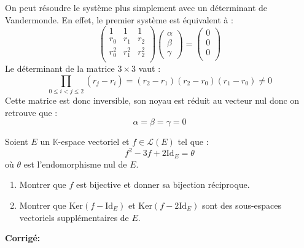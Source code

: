 \documentclass[a4paper,twoside,french,11pt]{VcCours}
\newcommand{\corr}{\textbf{Corrigé:}}
\begin{document}
\begin{enumerate}
\noindent On peut résoudre le système plus simplement avec un déterminant de Vandermonde. En effet, le premier système est équivalent à :
$$ \begin{pmatrix}
1 & 1 & 1 \\
r_0 & r_1 & r_2 \\
r_0^2 & r_1^2 & r_2^2 \\
\end{pmatrix} \begin{pmatrix}
\alpha \\
\beta \\
\gamma
\end{pmatrix} = \begin{pmatrix}
0 \\
0 \\
0 \\
\end{pmatrix}$$ 
Le déterminant de la matrice $3 \times 3$ vaut :
$$ \prod_{0 \leq i <j \leq 2} (r_j-r_i) = (r_2-r_1)(r_2-r_0)(r_1-r_0) \neq 0$$
Cette matrice est donc inversible, son noyau est réduit au vecteur nul donc on retrouve que :
$$ \alpha = \beta = \gamma = 0$$
\end{enumerate}





\begin{Exercice}{} Soient $E$ un $\mathbb{K}$-espace vectoriel et $f \in \mathcal{L}(E)$ tel que :
    \[
    f^2 - 3f + 2 \textrm{Id}_E = \theta
    \]
où $\theta$ est l'endomorphisme nul de $E$.
    \begin{enumerate}
      \item Montrer que $f$ est bijective et donner sa bijection réciproque.
      \item Montrer que $\textrm{Ker}(f - \textrm{Id}_E)$ et $\textrm{Ker}(f - 2\textrm{Id}_E)$ sont des sous-espaces vectoriels supplémentaires de $E$.
    \end{enumerate}
\end{Exercice}

\corr 
\end{document}
